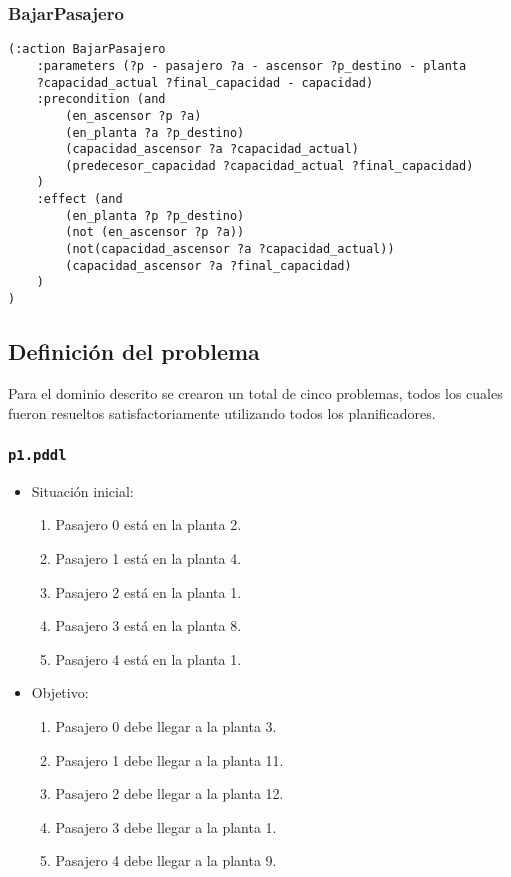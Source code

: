 \documentclass{article}
\begin{document}
\subsubsection{BajarPasajero}
\begin{verbatim}
(:action BajarPasajero
    :parameters (?p - pasajero ?a - ascensor ?p_destino - planta 
    ?capacidad_actual ?final_capacidad - capacidad)
    :precondition (and
        (en_ascensor ?p ?a)
        (en_planta ?a ?p_destino)
        (capacidad_ascensor ?a ?capacidad_actual)
        (predecesor_capacidad ?capacidad_actual ?final_capacidad)
    )
    :effect (and
        (en_planta ?p ?p_destino)
        (not (en_ascensor ?p ?a))
        (not(capacidad_ascensor ?a ?capacidad_actual))
        (capacidad_ascensor ?a ?final_capacidad)
    )
)
\end{verbatim}

\subsection{Definición del problema}
Para el dominio descrito se crearon un total de cinco problemas, todos los cuales fueron resueltos satisfactoriamente utilizando todos los planificadores.

\subsubsection{\texttt{p1.pddl}}
\begin{itemize}
    \item Situación inicial:
    \begin{enumerate}
        \item Pasajero 0 está en la planta 2.
        \item Pasajero 1 está en la planta 4.
        \item Pasajero 2 está en la planta 1.
        \item Pasajero 3 está en la planta 8.
        \item Pasajero 4 está en la planta 1.
    \end{enumerate}
    \item Objetivo:
    \begin{enumerate}
        \item Pasajero 0 debe llegar a la planta 3.
        \item Pasajero 1 debe llegar a la planta 11.
        \item Pasajero 2 debe llegar a la planta 12.
        \item Pasajero 3 debe llegar a la planta 1.
        \item Pasajero 4 debe llegar a la planta 9.
    \end{enumerate}
\end{itemize}
\end{document}
